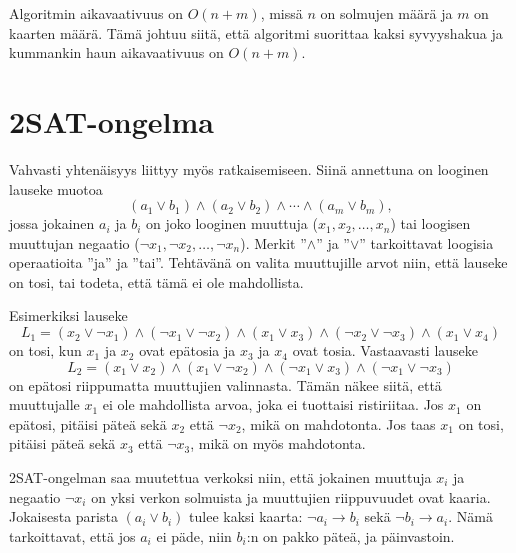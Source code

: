 Algoritmin aikavaativuus on $O(n+m)$,
missä $n$ on solmujen määrä ja $m$ on kaarten määrä.
Tämä johtuu siitä,
että algoritmi suorittaa kaksi syvyyshakua ja
kummankin haun aikavaativuus on $O(n+m)$.

\section{2SAT-ongelma}


Vahvasti yhtenäisyys liittyy myös  ratkaisemiseen.
Siinä annettuna on looginen lauseke muotoa
\[
(a_1 \lor b_1) \land (a_2 \lor b_2) \land \cdots \land (a_m \lor b_m),
\]
jossa jokainen $a_i$ ja $b_i$ on joko looginen muuttuja
($x_1,x_2,\ldots,x_n$)
tai loogisen muuttujan negaatio ($\lnot x_1, \lnot x_2, \ldots, \lnot x_n$).
Merkit ''$\land$'' ja ''$\lor$'' tarkoittavat
loogisia operaatioita ''ja'' ja ''tai''.
Tehtävänä on valita muuttujille arvot niin,
että lauseke on tosi,
tai todeta, että tämä ei ole mahdollista.

Esimerkiksi lauseke
\[
L_1 = (x_2 \lor \lnot x_1) \land
      (\lnot x_1 \lor \lnot x_2) \land
      (x_1 \lor x_3) \land
      (\lnot x_2 \lor \lnot x_3) \land
      (x_1 \lor x_4)
\]
on tosi, kun $x_1$ ja $x_2$ ovat epätosia
ja $x_3$ ja $x_4$ ovat tosia.
Vastaavasti lauseke
\[
L_2 = (x_1 \lor x_2) \land
      (x_1 \lor \lnot x_2) \land
      (\lnot x_1 \lor x_3) \land
      (\lnot x_1 \lor \lnot x_3)
\]
on epätosi riippumatta muuttujien valinnasta.
Tämän näkee siitä, että muuttujalle $x_1$
ei ole mahdollista arvoa, joka ei tuottaisi ristiriitaa.
Jos $x_1$ on epätosi, pitäisi päteä sekä $x_2$ että $\lnot x_2$,
mikä on mahdotonta.
Jos taas $x_1$ on tosi,
pitäisi päteä sekä $x_3$ että $\lnot x_3$,
mikä on myös mahdotonta.

2SAT-ongelman saa muutettua verkoksi niin,
että jokainen muuttuja $x_i$ ja negaatio $\lnot x_i$
on yksi verkon solmuista
ja muuttujien riippuvuudet ovat kaaria.
Jokaisesta parista $(a_i \lor b_i)$ tulee kaksi
kaarta: $\lnot a_i \to b_i$ sekä $\lnot b_i \to a_i$.
Nämä tarkoittavat, että jos $a_i$ ei päde,
niin $b_i$:n on pakko päteä, ja päinvastoin.

